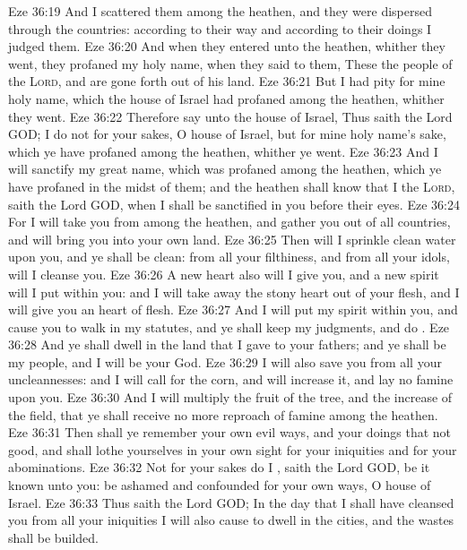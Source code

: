 \vs Eze 36:19 And I scattered them among the heathen, and they were dispersed through the countries: according to their way and according to their doings I judged them.
\vs Eze 36:20 And when they entered unto the heathen, whither they went, they profaned my holy name, when they said to them, These  the people of the \textsc{Lord}, and are gone forth out of his land.
\vs Eze 36:21 But I had pity for mine holy name, which the house of Israel had profaned among the heathen, whither they went.
\vs Eze 36:22 Therefore say unto the house of Israel, Thus saith the Lord GOD; I do not  for your sakes, O house of Israel, but for mine holy name's sake, which ye have profaned among the heathen, whither ye went.
\vs Eze 36:23 And I will sanctify my great name, which was profaned among the heathen, which ye have profaned in the midst of them; and the heathen shall know that I  the \textsc{Lord}, saith the Lord GOD, when I shall be sanctified in you before their eyes.
\vs Eze 36:24 For I will take you from among the heathen, and gather you out of all countries, and will bring you into your own land.
\vs Eze 36:25 Then will I sprinkle clean water upon you, and ye shall be clean: from all your filthiness, and from all your idols, will I cleanse you.
\vs Eze 36:26 A new heart also will I give you, and a new spirit will I put within you: and I will take away the stony heart out of your flesh, and I will give you an heart of flesh.
\vs Eze 36:27 And I will put my spirit within you, and cause you to walk in my statutes, and ye shall keep my judgments, and do .
\vs Eze 36:28 And ye shall dwell in the land that I gave to your fathers; and ye shall be my people, and I will be your God.
\vs Eze 36:29 I will also save you from all your uncleannesses: and I will call for the corn, and will increase it, and lay no famine upon you.
\vs Eze 36:30 And I will multiply the fruit of the tree, and the increase of the field, that ye shall receive no more reproach of famine among the heathen.
\vs Eze 36:31 Then shall ye remember your own evil ways, and your doings that  not good, and shall lothe yourselves in your own sight for your iniquities and for your abominations.
\vs Eze 36:32 Not for your sakes do I , saith the Lord GOD, be it known unto you: be ashamed and confounded for your own ways, O house of Israel.
\vs Eze 36:33 Thus saith the Lord GOD; In the day that I shall have cleansed you from all your iniquities I will also cause  to dwell in the cities, and the wastes shall be builded.
